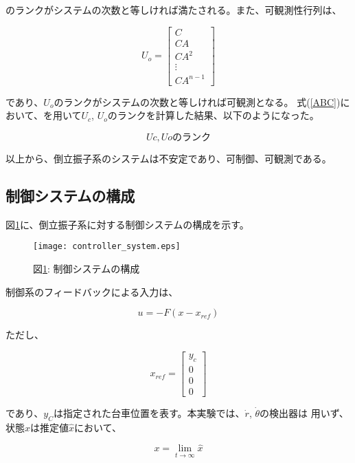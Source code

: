 のランクがシステムの次数と等しければ満たされる。また、可観測性行列は、

$$
    U_{o} = 
    \left[
        \begin{array}{c}
            C \\
            CA \\
            CA^2 \\
            \vdots \\
            CA^{n-1}
        \end{array}
    \right]
$$

であり、$U_{o}$のランクがシステムの次数と等しければ可観測となる。
式(\ref{ABC})において、\MaTX{}を用いて$U_{c}$, $U_{o}$のランクを計算した結果、以下のようになった。

$$
    Uc, Uoのランク
$$

以上から、倒立振子系のシステムは不安定であり、可制御、可観測である。

\subsection{制御システムの構成}
図\ref{controller_system}に、倒立振子系に対する制御システムの構成を示す。

\begin{figure}[htbp]
    \begin{center}
        \texttt{[image: controller\_system.eps]}
        \caption{図\ref{controller_system}: 制御システムの構成}
        \label{controller_system}
    \end{center}
\end{figure}

制御系のフィードバックによる入力は、

$$
    u = -F \left( x - x_{ref} \right)
$$

ただし、

$$
    x_{ref} =
    \left[
        \begin{array}{c}
            y_{c} \\
            0 \\
            0 \\
            0
        \end{array}
    \right]
$$

であり、$y_{C}$は指定された台車位置を表す。本実験では、$\dot{r}$, $\dot{\theta}$の検出器は
用いず、状態$x$は推定値$\hat{x}$において、

\begin{equation}
    x = \lim_{t \to \infty} \hat{x}
    \label{definition_x}
\end{equation}

